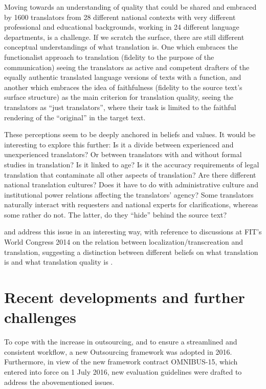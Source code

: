 \documentclass[output=paper]{langsci/langscibook}
\begin{document}
Moving towards an understanding of quality that could be shared and embraced by 1600 translators from 28 different national contexts with very different professional and educational backgrounds, working in 24 different language departments, is a challenge. If we scratch the surface, there are still different conceptual understandings of what translation is. One which embraces the functionalist approach to translation (fidelity to the purpose of the communication) seeing the translators as active and competent drafters of the equally authentic translated language versions of texts with a function, and another which embraces the idea of faithfulness (fidelity to the source text's surface structure) as the main criterion for translation quality, seeing the translators as ``just translators'', where their task is limited to the faithful rendering of the ``original'' in the target text. 

These perceptions seem to be deeply anchored in beliefs and values. It would be interesting to explore this further: Is it a divide between experienced and unexperienced translators? Or between translators with and without formal studies in translation? Is it linked to age? Is it the accuracy requirements of legal translation that contaminate all other aspects of translation? Are there different national translation cultures? Does it have to do with administrative culture and institutional power relations affecting the translators' agency? Some translators naturally interact with requesters and national experts for clarifications, whereas some rather do not. The latter, do they ``hide'' behind the source text? 

\citet{MelbyEtAl2014} and \citet{KobyEtAl2014} address this issue in an interesting way, with reference to discussions at FIT's World Congress 2014 on the relation between localization/transcreation and translation, suggesting a distinction between different beliefs on what translation is \citep[392-403]{MelbyEtAl2014} and what translation quality is \citep[413-420]{KobyEtAl2014}.

\section{Recent developments and further challenges}\label{sec:strandvik:strandvic:6} 

To cope with the increase in outsourcing, and to ensure a streamlined and consistent workflow, a new Outsourcing framework was adopted in 2016. Furthermore, in view of the new framework contract OMNIBUS-15, which entered into force on 1 July 2016, new evaluation guidelines were drafted to address the abovementioned issues. 
\end{document}
